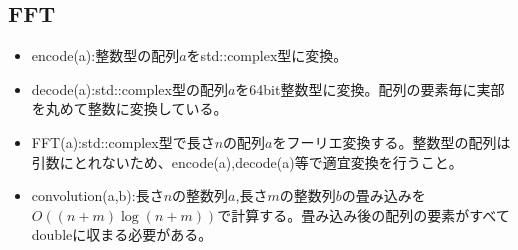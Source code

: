 \subsection{FFT}


\begin{itemize}
    \item encode(a):整数型の配列$a$をstd::complex型に変換。
    \item decode(a):std::complex型の配列$a$を64bit整数型に変換。配列の要素毎に実部を丸めて整数に変換している。
    \item FFT(a):std::complex型で長さ$n$の配列$a$をフーリエ変換する。整数型の配列は引数にとれないため、encode(a),decode(a)等で適宜変換を行うこと。
    \item convolution(a,b):長さ$n$の整数列$a$,長さ$m$の整数列$b$の畳み込みを$O((n+m)\log(n+m))$で計算する。畳み込み後の配列の要素がすべてdoubleに収まる必要がある。
\end{itemize}

